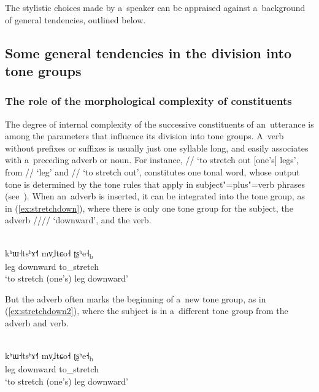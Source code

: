 The stylistic choices made by a~speaker can be appraised against a~background of general tendencies,
outlined below.


\subsection[Some general tendencies]{Some general tendencies in the division into tone groups}
\label{sec:somegeneraltendenciesinthedivisionintotonegroups}


\subsubsection{The role of the morphological complexity of constituents}
\label{sec:theroleofthemorphologicalcomplexityofconstituents}


The degree of internal complexity of the successive constituents of an~utterance is among the parameters that influence its division into tone groups. A~verb without prefixes or suffixes is
usually just one syllable long, and easily associates with a~preceding adverb or
noun. For instance, // ‘to stretch out [one’s] legs’, from //
‘leg’ and // ‘to stretch out’, constitutes one tonal word, whose output tone is
determined by the tone rules that apply in subject"=plus"=verb phrases (see~). When
an~adverb is inserted, it can be integrated into the tone group, as in (\ref{ex:stretchdown}), where there is only one tone group for the subject, the adverb ////
‘downward’, and the verb.
\begin{exe}
	\ex
	\label{ex:stretchdown}
	\\
	\gll kʰɯ˧tsʰɤ˧˥		mv̩˩tɕo˧		ʈʂʰe˧\textsubscript{b}\\
	leg		downward	to\_stretch\\
	\glt ‘to stretch (one’s) leg downward’
\end{exe}

But the adverb often marks the beginning of a~new tone group, as in (\ref{ex:stretchdown2}), where the subject is in a~different tone group from the adverb and verb.

\begin{exe}
	\ex
	\label{ex:stretchdown2}
	\\
	\gll kʰɯ˧tsʰɤ˧˥		mv̩˩tɕo˧		ʈʂʰe˧\textsubscript{b}\\
	leg		downward	to\_stretch\\
	\glt ‘to stretch (one’s) leg downward’
\end{exe}

